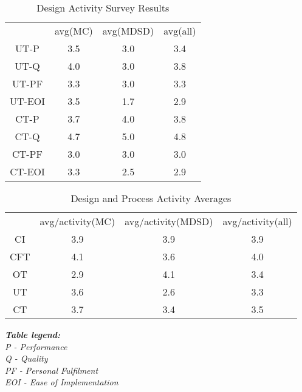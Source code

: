 \documentclass[final_report_innit.tex]{subfiles}
\newcommand\Tstrut{\rule{0pt}{2.6ex}}       %
\begin{document}
\begin{table}[h]
	\caption{Design Activity Survey Results}
	\begin{center}
		\begin{tabular}{cccc}
		           & avg(MC) & avg(MDSD) & avg(all) \Tstrut \\ 
			UT-P   & 3.5 & 3.0 & 3.4 \Tstrut \\  
			UT-Q   & 4.0 & 3.0 & 3.8 \Tstrut \\ 
			UT-PF  & 3.3 & 3.0 & 3.3 \Tstrut \\ 
			UT-EOI & 3.5 & 1.7 & 2.9 \Tstrut \\ 
			CT-P   & 3.7 & 4.0 & 3.8 \Tstrut \\ 
			CT-Q   & 4.7 & 5.0 & 4.8 \Tstrut \\ 
			CT-PF  & 3.0 & 3.0 & 3.0 \Tstrut \\ 
			CT-EOI & 3.3 & 2.5 & 2.9 \Tstrut \\ 
		\end{tabular}
	\end{center}
\end{table}


\begin{table}[h]
	\caption{Design and Process Activity Averages}
	\begin{center}
		\begin{tabular}{cccc}
		           & avg/activity(MC) & avg/activity(MDSD) & avg/activity(all) \Tstrut \\ 
			CI  & 3.9 & 3.9 & 3.9 \Tstrut \\  
			CFT & 4.1 & 3.6 & 4.0 \Tstrut \\ 
			OT  & 2.9 & 4.1 & 3.4 \Tstrut \\ 
			UT  & 3.6 & 2.6 & 3.3 \Tstrut \\ 
			CT  & 3.7 & 3.4 & 3.5 \Tstrut \\ 

		\end{tabular}
	\end{center}
\end{table}

\smallskip
\smallskip
\smallskip
\smallskip
\smallskip
\smallskip
\smallskip
\smallskip
\smallskip
\smallskip
\smallskip
\smallskip
\smallskip
\smallskip

\smallskip
\smallskip
\smallskip
\smallskip
\smallskip


\noindent
\textit{
\textbf{\hspace{12 mm}Table legend:}
\\
\hspace*{13 mm}P - Performance
\\
\hspace*{13 mm}Q - Quality
\\
\hspace*{13 mm}PF - Personal Fulfilment
\\
\hspace*{13 mm}EOI - Ease of Implementation
}

\smallskip
\smallskip
\smallskip
\end{document}
